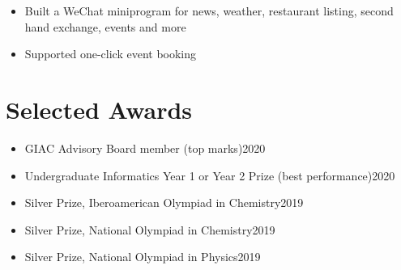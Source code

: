 \documentclass{resume}
\begin{document}
\begin{itemize}
    \item Built a WeChat miniprogram for news, weather, restaurant listing, second hand exchange, events and more
    \item Supported one-click event booking
\end{itemize}



\section{Selected Awards}
\begin{itemize}
    \item GIAC Advisory Board member (top marks)\hfill 2020
    \item Undergraduate Informatics Year 1 or Year 2 Prize (best performance)\hfill 2020
    \item Silver Prize, Iberoamerican Olympiad in Chemistry\hfill 2019
    \item Silver Prize, National Olympiad in Chemistry\hfill 2019
    \item Silver Prize, National Olympiad in Physics\hfill 2019
\end{itemize}


\end{document}
